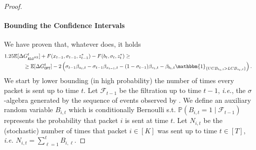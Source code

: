\begin{proof}
    \paragraph{Bounding the Confidence Intervals}
    We have proven that, whatever \opt does, it holds
    \begin{align*}
        1.25\mathbb{E}[\Delta& \Galgrtwo^t] + F(x_{t-1}, \sigma_{t-1}, z_{t-1}^*)-F(b_{t}, \sigma_{t}, z_{t}^*) \ge \\
        &\ge\mathbb{E}[\Delta \Gopt^t]-2\left(\sigma_{t-1}\beta_{a_t, t}-\sigma_{t-1}\beta_{x_{t-1}, t}-(1-\sigma_{t-1})\beta_{v_t, t}-\beta_{b_t, t}\mathbbm{1}_{\{\ucbb > LCB_{v_{t},t}\}}\right).
    \end{align*}
    We start by lower bounding (in high probability) the number of times every packet is sent up to time $t$. Let $\mathcal{F}_{t-1}$ be the filtration up to time $t-1$, \emph{i.e.}, the $\sigma$-algebra generated by the sequence of events observed by \algrtwo. We define an auxiliary random variable $B_{i,t}$ which is conditionally Bernoulli s.t. $\mathbb{P}\left(B_{i,t} = 1 \mid \mathcal{F}_{t-1}\right) $ represents the probability that packet $i$ is sent at time $t$. Let $N_{i,t}$ be the (stochastic) number of times that packet $i \in [K]$ was sent up to time $t \in [T]$, \emph{i.e.} $N_{i,t} = \sum_{\ell=1}^t B_{i,\ell}$.

\end{proof}
